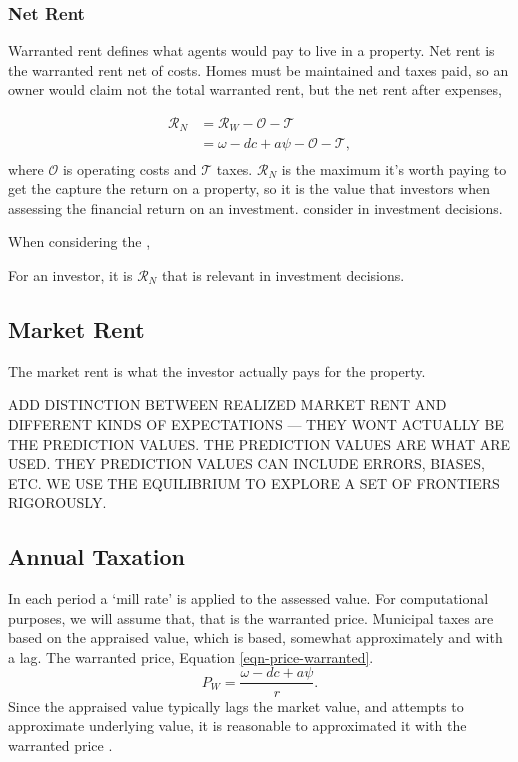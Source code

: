 \subsubsection{Net Rent}
Warranted rent defines what agents would pay to live in a property. Net rent is the warranted rent net of costs. Homes must be maintained and taxes paid, so an owner would claim not the total warranted rent, but the net rent after expenses,

\begin{align}
\mathcal{R}_N &= \mathcal{R}_W - \mathcal{O} - \mathcal{T}\\
&= \omega - {dc} + a\psi -  \mathcal{O} - \mathcal{T}, \\
\end{align}
where $\mathcal{O}$ is operating costs and  $\mathcal{T}$ taxes.   $\mathcal{R}_N$ is the maximum it's worth paying to get the capture the return on a property, so it is the value that investors when assessing the \gls{financial return} on an investment.
consider in investment decisions. %


When considering the , 

For an investor, it is $\mathcal{R}_N$  that is relevant in investment decisions. %

\subsection{Market Rent}
The market rent is what the investor actually pays for the property.

ADD DISTINCTION BETWEEN REALIZED MARKET RENT AND DIFFERENT KINDS OF EXPECTATIONS --- THEY WONT ACTUALLY BE THE PREDICTION VALUES. THE PREDICTION VALUES ARE WHAT ARE USED. 
THEY PREDICTION VALUES CAN INCLUDE ERRORS, BIASES, ETC.
WE USE THE EQUILIBRIUM TO EXPLORE A SET OF FRONTIERS RIGOROUSLY.

\subsection{Annual Taxation}
In each  period a `mill rate' is applied to the assessed value. For computational purposes, we will assume that, that is the warranted price.  Municipal taxes are based on the appraised value, which is based, somewhat approximately and with a lag. The warranted price,  Equation \ref{eqn-price-warranted}.
\[P_W = \frac{\omega- {dc} + a\psi}{r}.\]
Since the appraised value typically lags the market value, and attempts to approximate underlying value, it is reasonable to approximated it with the warranted price \cite{apraised_value_refs}.

